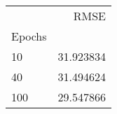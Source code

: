 \begin{tabular}{lr}
\toprule
 & RMSE \\
Epochs &  \\
\midrule
10 & 31.923834 \\
40 & 31.494624 \\
100 & 29.547866 \\
\bottomrule
\end{tabular}
